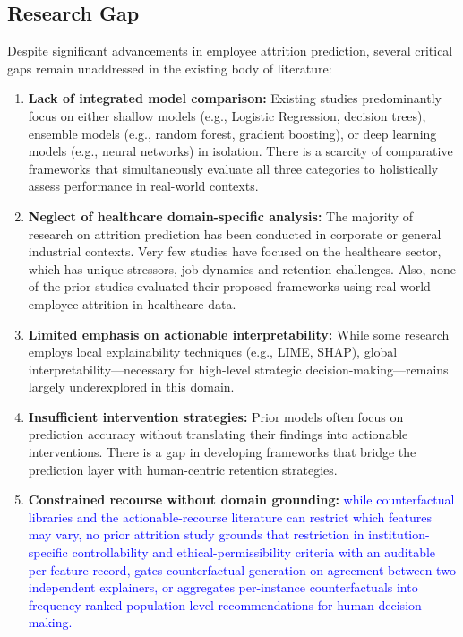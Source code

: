 \documentclass[a4paper,fleqn]{cas-sc}
\begin{document}
\subsection{Research Gap}
Despite significant advancements in employee attrition prediction, several critical gaps remain unaddressed in the existing body of literature:

\begin{enumerate}
    \item \textbf{Lack of integrated model comparison:} Existing studies predominantly focus on either shallow models (e.g., Logistic Regression, decision trees), ensemble models (e.g., random forest, gradient boosting), or deep learning models (e.g., neural networks) in isolation. There is a scarcity of comparative frameworks that simultaneously evaluate all three categories to holistically assess performance in real-world contexts.

    \item \textbf{Neglect of healthcare domain-specific analysis:} The majority of research on attrition prediction has been conducted in corporate or general industrial contexts. Very few studies have focused on the healthcare sector, which has unique stressors, job dynamics and retention challenges. Also, none of the prior studies evaluated their proposed frameworks using real-world employee attrition in healthcare data. 

    \item \textbf{Limited emphasis on actionable interpretability:} While some research employs local explainability techniques (e.g., LIME, SHAP), global interpretability—necessary for high-level strategic decision-making—remains largely underexplored in this domain.

    \item \textbf{Insufficient intervention strategies:} Prior models often focus on prediction accuracy without translating their findings into actionable interventions. There is a gap in developing frameworks that bridge the prediction layer with human-centric retention strategies.
    \item \textbf{Constrained recourse without domain grounding:} \textcolor{blue}{while counterfactual libraries and the actionable-recourse literature can restrict which features may vary, no prior attrition study grounds that restriction in institution-specific controllability and ethical-permissibility criteria with an auditable per-feature record, gates counterfactual generation on agreement between two independent explainers, or aggregates per-instance counterfactuals into frequency-ranked population-level recommendations for human decision-making.}
\end{enumerate}
\end{document}
